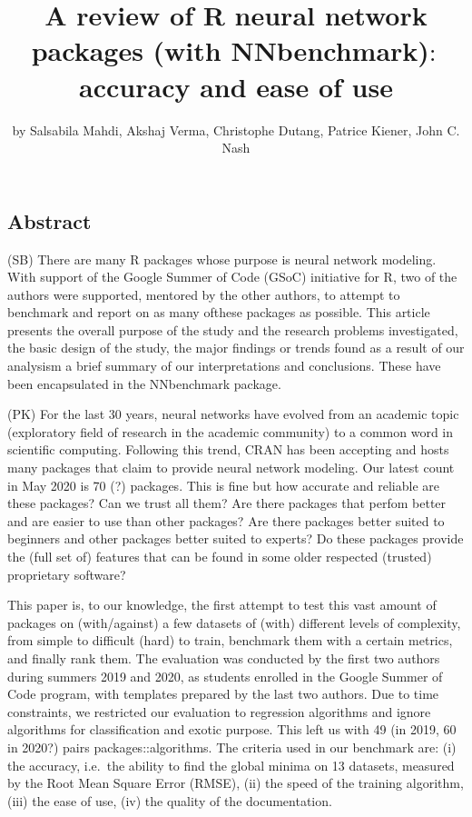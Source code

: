 \title{A review of R neural network packages (with NNbenchmark)\(:\)
accuracy and ease of use}
\author{by Salsabila Mahdi, Akshaj Verma, Christophe Dutang, Patrice
Kiener, John C. Nash}

\maketitle


\hypertarget{abstract}{%
\subsection{Abstract}\label{abstract}}

(SB) There are many R packages whose purpose is neural network modeling.
With support of the Google Summer of Code (GSoC) initiative for R, two
of the authors were supported, mentored by the other authors, to attempt
to benchmark and report on as many ofthese packages as possible. This
article presents the overall purpose of the study and the research
problems investigated, the basic design of the study, the major findings
or trends found as a result of our analysism a brief summary of our
interpretations and conclusions. These have been encapsulated in the
NNbenchmark package.

(PK) For the last 30 years, neural networks have evolved from an
academic topic (exploratory field of research in the academic community)
to a common word in scientific computing. Following this trend, CRAN has
been accepting and hosts many packages that claim to provide neural
network modeling. Our latest count in May 2020 is 70 (?) packages. This
is fine but how accurate and reliable are these packages? Can we trust
all them? Are there packages that perfom better and are easier to use
than other packages? Are there packages better suited to beginners and
other packages better suited to experts? Do these packages provide the
(full set of) features that can be found in some older respected
(trusted) proprietary software?

This paper is, to our knowledge, the first attempt to test this vast
amount of packages on (with/against) a few datasets of (with) different
levels of complexity, from simple to difficult (hard) to train,
benchmark them with a certain metrics, and finally rank them. The
evaluation was conducted by the first two authors during summers 2019
and 2020, as students enrolled in the Google Summer of Code program,
with templates prepared by the last two authors. Due to time
constraints, we restricted our evaluation to regression algorithms and
ignore algorithms for classification and exotic purpose. This left us
with 49 (in 2019, 60 in 2020?) pairs packages::algorithms. The criteria
used in our benchmark are: (i) the accuracy, i.e.~the ability to find
the global minima on 13 datasets, measured by the Root Mean Square Error
(RMSE), (ii) the speed of the training algorithm, (iii) the ease of use,
(iv) the quality of the documentation.

